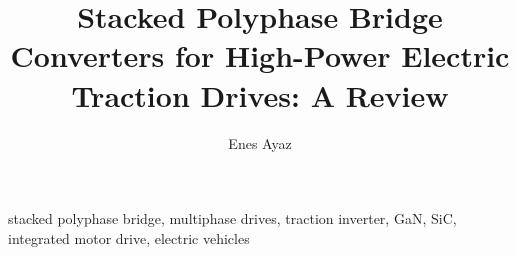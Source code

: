 \documentclass[journal]{IEEEtran}
\title{Stacked Polyphase Bridge Converters for High-Power Electric Traction Drives: A Review}
\author{Enes Ayaz}
\begin{document}
\maketitle



\begin{abstract}


\end{abstract}



\begin{IEEEkeywords}

stacked polyphase bridge,
multiphase drives,
traction inverter,
GaN,
SiC,
integrated motor drive,
electric vehicles

\end{IEEEkeywords}






































\end{document}
